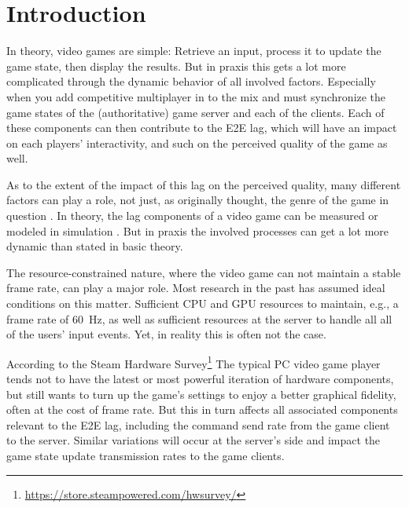 
\section{Introduction}

In theory, video games are simple: Retrieve an input, process it to update the game state, then display the results. But in praxis this gets a lot more complicated through the dynamic behavior of all involved factors. Especially when you add competitive multiplayer in to the mix and must synchronize the game states of the (authoritative) game server and each of the clients. Each of these components can then contribute to the \gls{E2E} lag, which will have an impact on each players' interactivity, and such on the perceived quality of the game as well\cite{Claypool:2006:LPA:1167838.1167860,7965676}. 

As to the extent of the impact of this lag on the perceived quality, many different factors can play a role, not just, as originally thought, the genre of the game in question \cite{mollertowards,Slivar:2016:CGQ:2910017.2910602}. In theory, the lag components of a video game can be measured \cite{7148095} or modeled in simulation \cite{Metzger+2016}. But in praxis the involved processes can get a lot more dynamic than stated in basic theory. 

The resource-constrained nature, where the video game can not maintain a stable frame rate, can play a major role. Most research in the past has assumed ideal conditions on this matter. Sufficient CPU and GPU resources to maintain, e.g., a frame rate of \SI{60}{\hertz}, as well as sufficient resources at the server to handle all all of the users' input events. Yet, in reality this is often not the case. 

According to the Steam Hardware Survey\footnote{\url{https://store.steampowered.com/hwsurvey/}} The typical PC video game player tends not to have the latest or most powerful iteration of hardware components, but still wants to turn up the game's settings to enjoy a better graphical fidelity, often at the cost of frame rate. But this in turn affects all associated components relevant to the \gls{E2E} lag, including the command send rate from the game client to the server. Similar variations will occur at the server's side and impact the game state update transmission rates to the game clients.

